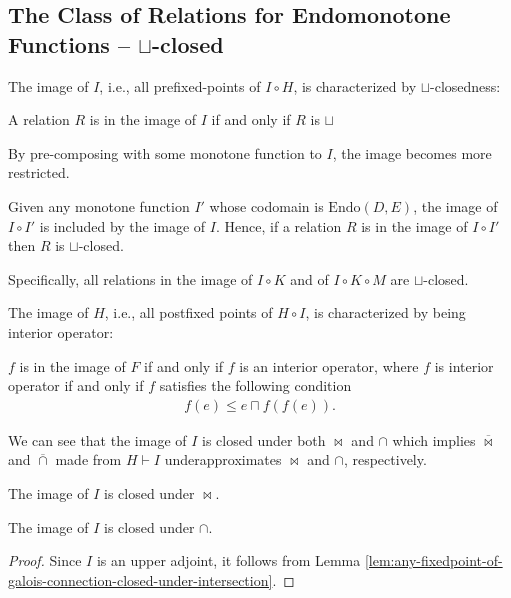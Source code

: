 \documentclass{llncs}
\newcommand{\Endo}{\mathrm{Endo}}
\newcommand{\join}{\sqcup}
\newcommand{\comp}{\circ}
\newcommand{\bowtielift}{\mathbin{\overline{\bowtie}}}
\newcommand{\caplift}{\mathbin{\overline{\cap}}}
\begin{document}
  \subsection{The Class of Relations for Endomonotone Functions -- $\join$-closed}
  The image of $I$, i.e., all prefixed-points of $I \comp H$, is characterized by $\join$-closedness:
  \begin{theorem}\label{thm:join-closed}
    A relation $R$ is in the image of $I$ if and only if $R$ is $\join$ 
  \end{theorem}

  By pre-composing with some monotone function to $I$, the image becomes more restricted.
  \begin{proposition} \label{prop:restriction-subset}
    Given any monotone function $I'$ whose codomain is $\Endo(D, E)$, the image of $I \comp I'$ is included by the image of $I$.
    Hence, if a relation $R$ is in the image of $I \comp I'$ then $R$ is $\join$-closed.
  \end{proposition}
  Specifically, all relations in the image of $I \comp K$ and of $I \comp K \comp M$ are $\join$-closed.

  The image of $H$, i.e., all postfixed points of $H \comp I$, is characterized by being interior operator:
  \begin{proposition}\label{prop:interior-op}
  $f$ is in the image of $F$ if and only if $f$ is an interior operator,
  where $f$ is interior operator if and only if $f$ satisfies the following condition
  \begin{align*}
    f(e) \leq  e \sqcap f (f (e)).
  \end{align*}
  \end{proposition}

  We can see that the image of $I$ is closed under both $\bowtie$ and $\cap$ which implies $\bowtielift$ and $\caplift$ made from $H \vdash I$ underapproximates $\bowtie$ and $\cap$, respectively.
  \begin{proposition}\label{prop:endo-closed-under-composition}
    The image of $I$ is closed under $\bowtie$.
  \end{proposition}
  \begin{proposition}\label{prop:endo-closed-under-intersection}
    The image of $I$ is closed under $\cap$.
    \begin{proof}
      Since $I$ is an upper adjoint, it follows from Lemma \ref{lem:any-fixedpoint-of-galois-connection-closed-under-intersection}.
    \end{proof}
  \end{proposition}
\end{document}
